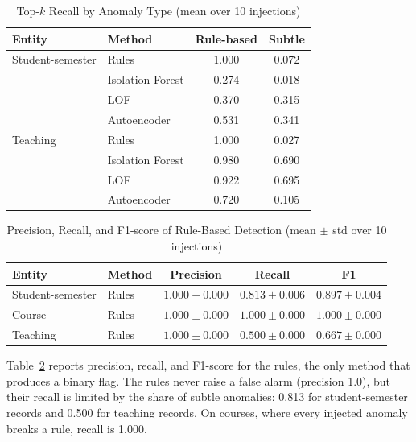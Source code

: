 \documentclass[conference]{IEEEtran}
\begin{document}
\begin{table}[htbp]
\caption{Top-$k$ Recall by Anomaly Type (mean over 10 injections)}
\begin{center}
\begin{tabular}{llcc}
\toprule
\textbf{Entity} & \textbf{Method} & \textbf{Rule-based} & \textbf{Subtle} \\
\midrule
Student-semester & Rules & 1.000 & 0.072 \\
 & Isolation Forest & 0.274 & 0.018 \\
 & LOF & 0.370 & 0.315 \\
 & Autoencoder & 0.531 & 0.341 \\
\midrule
Teaching & Rules & 1.000 & 0.027 \\
 & Isolation Forest & 0.980 & 0.690 \\
 & LOF & 0.922 & 0.695 \\
 & Autoencoder & 0.720 & 0.105 \\
\bottomrule
\end{tabular}
\label{tab:subtle}
\end{center}
\end{table}

\begin{table}[htbp]
\caption{Precision, Recall, and F1-score of Rule-Based Detection (mean $\pm$ std over 10 injections)}
\begin{center}
\footnotesize\setlength{\tabcolsep}{2pt}
\begin{tabular}{llccc}
\toprule
\textbf{Entity} & \textbf{Method} & \textbf{Precision} & \textbf{Recall} & \textbf{F1} \\
\midrule
Student-semester & Rules & $1.000{\pm}0.000$ & $0.813{\pm}0.006$ & $0.897{\pm}0.004$ \\
\midrule
Course & Rules & $1.000{\pm}0.000$ & $1.000{\pm}0.000$ & $1.000{\pm}0.000$ \\
\midrule
Teaching & Rules & $1.000{\pm}0.000$ & $0.500{\pm}0.000$ & $0.667{\pm}0.000$ \\
\bottomrule
\end{tabular}
\label{tab:prf}
\end{center}
\end{table}

Table~\ref{tab:prf} reports precision, recall, and F1-score for the rules, the only method that produces a binary flag. The rules never raise a false alarm (precision 1.0), but their recall is limited by the share of subtle anomalies: 0.813 for student-semester records and 0.500 for teaching records. On courses, where every injected anomaly breaks a rule, recall is 1.000.
\end{document}
